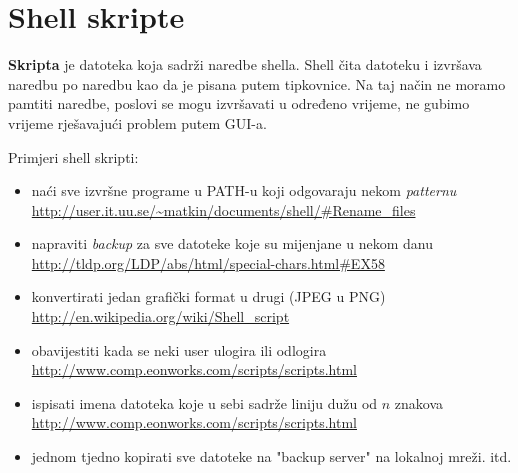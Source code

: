 \section{Shell skripte}






\textbf{Skripta} je datoteka koja sadrži naredbe shella. Shell čita datoteku i izvršava naredbu po naredbu kao da je pisana putem tipkovnice. Na taj način ne moramo pamtiti naredbe, poslovi se mogu izvršavati u određeno vrijeme, ne gubimo vrijeme rješavajući problem putem GUI-a.

\begin{primjer} Primjeri shell skripti: 
\begin{itemize}
\item  naći sve izvršne programe u PATH-u koji odgovaraju nekom \textit{patternu} \url{http://user.it.uu.se/~matkin/documents/shell/#Rename_files}
\item  napraviti \textit{backup} za sve datoteke koje su mijenjane u nekom danu \url{http://tldp.org/LDP/abs/html/special-chars.html#EX58}
\item  konvertirati jedan grafički format u drugi (JPEG u PNG) \url{http://en.wikipedia.org/wiki/Shell_script}
\item  obavijestiti kada se neki user ulogira ili odlogira \url{http://www.comp.eonworks.com/scripts/scripts.html}
\item ispisati imena datoteka koje u sebi sadrže liniju dužu od $n$ znakova \url{http://www.comp.eonworks.com/scripts/scripts.html}
\item jednom tjedno kopirati sve datoteke na "backup server" na lokalnoj mreži.
itd.
\end{itemize}
\end{primjer}

